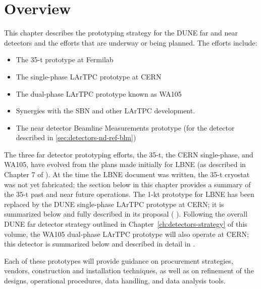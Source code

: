 \section{Overview}
\label{sec:proto-overview}


This chapter describes the prototyping strategy for the DUNE  far and near detectors and the efforts that are underway or being planned.  The efforts include:

\begin{itemize}
\item The 35-t prototype at Fermilab
\item The single-phase LArTPC prototype at CERN
\item The dual-phase LArTPC prototype known as WA105 
\item Synergies with the SBN and other LArTPC development.
\item The near detector Beamline Measurements prototype (for the detector described in \ref{sec:detectors-nd-ref-blm})
\end{itemize}

The three far detector prototyping efforts, the 35-t, the CERN
single-phase, and WA105, have evolved from the plans made initially
for LBNE (as described in Chapter 7 of \anxlbnefd ).  At the time the
LBNE document was written, the 35-t cryostat was not yet fabricated;
the section below in this chapter provides a summary of the 35-t
past and near future operations.  The 1-kt prototype for LBNE has
been replaced by the DUNE single-phase LArTPC prototype at CERN; it is
summarized below and fully described in its proposal (\anxcernproto
).  Following the overall DUNE far detector strategy outlined in
Chapter~\ref{ch:detectors-strategy} of this volume, the WA105
dual-phase LArTPC prototype will also operate at CERN; this detector
is summarized below and described in detail in \anxdualtdr .


Each of these prototypes will provide guidance on procurement
strategies, vendors, construction and installation techniques, as well
as on refinement of the designs, operational procedures, data handling,
and data analysis tools.
